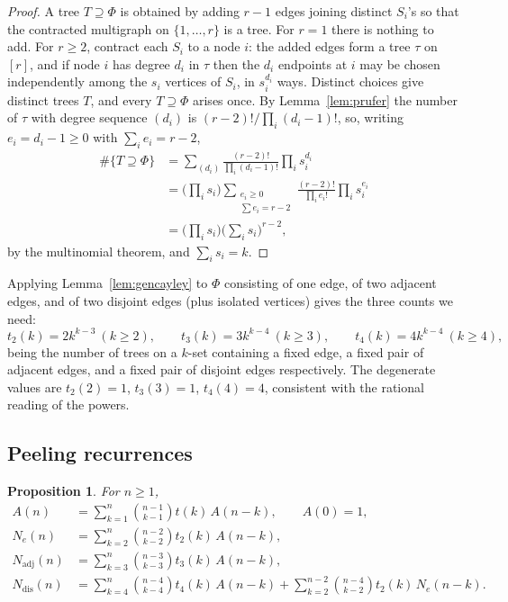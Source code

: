 \documentclass[11pt,a4paper]{amsart}
\theoremstyle{plain}
\newtheorem{proposition}[theorem]{Proposition}
\theoremstyle{definition}
\newcommand{\Nc}{N}
\begin{document}
\begin{proof}
A tree $T \supseteq \Phi$ is obtained by adding $r-1$ edges joining distinct
$S_i$'s so that the contracted multigraph on $\{1,\dots,r\}$ is a tree. For $r=1$
there is nothing to add. For $r \ge 2$, contract each $S_i$ to a node $i$: the
added edges form a tree $\tau$ on $[r]$, and if node $i$ has degree $d_i$ in
$\tau$ then the $d_i$ endpoints at $i$ may be chosen independently among the
$s_i$ vertices of $S_i$, in $s_i^{d_i}$ ways. Distinct choices give distinct
trees $T$, and every $T \supseteq \Phi$ arises once. By
Lemma~\ref{lem:prufer} the number of $\tau$ with degree sequence $(d_i)$ is
$(r-2)!/\prod_i (d_i-1)!$, so, writing $e_i = d_i-1 \ge 0$ with
$\sum_i e_i = r-2$,
\[
\begin{aligned}
  \#\{T \supseteq \Phi\}
  &= \sum_{(d_i)} \frac{(r-2)!}{\prod_i (d_i-1)!}\prod_i s_i^{d_i}\\
  &= \Big(\prod_i s_i\Big)\sum_{\substack{e_i \ge 0\\ \sum e_i = r-2}}
      \frac{(r-2)!}{\prod_i e_i!}\prod_i s_i^{e_i}\\
  &= \Big(\prod_i s_i\Big)\Big(\sum_i s_i\Big)^{r-2},
\end{aligned}
\]
by the multinomial theorem, and $\sum_i s_i = k$.
\end{proof}

Applying Lemma~\ref{lem:gencayley} to $\Phi$ consisting of one edge, of two
adjacent edges, and of two disjoint edges (plus isolated vertices) gives the
three counts we need:
\begin{equation}\label{eq:t234}
  t_2(k) = 2k^{k-3}\ (k\ge2),\qquad
  t_3(k) = 3k^{k-4}\ (k\ge3),\qquad
  t_4(k) = 4k^{k-4}\ (k\ge4),
\end{equation}
being the number of trees on a $k$-set containing a fixed edge, a fixed pair of
adjacent edges, and a fixed pair of disjoint edges respectively. The degenerate
values are $t_2(2)=1$, $t_3(3)=1$, $t_4(4)=4$, consistent with the rational
reading of the powers.

\subsection{Peeling recurrences}

\begin{proposition}\label{prop:recur}
For $n \ge 1$,
\begin{align}
  A(n) &= \sum_{k=1}^{n}\binom{n-1}{k-1}t(k)\,A(n-k), \qquad A(0)=1,
    \label{eq:recA}\\
  \Nc_e(n) &= \sum_{k=2}^{n}\binom{n-2}{k-2}t_2(k)\,A(n-k),
    \label{eq:recNe}\\
  \Nc_{\mathrm{adj}}(n) &= \sum_{k=3}^{n}\binom{n-3}{k-3}t_3(k)\,A(n-k),
    \label{eq:recNadj}\\
  \Nc_{\mathrm{dis}}(n) &= \sum_{k=4}^{n}\binom{n-4}{k-4}t_4(k)\,A(n-k)
       + \sum_{k=2}^{n-2}\binom{n-4}{k-2}t_2(k)\,\Nc_e(n-k).
    \label{eq:recNdis}
\end{align}
\end{proposition}
\end{document}
